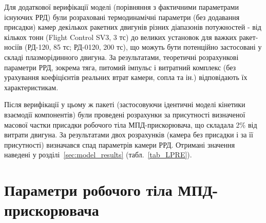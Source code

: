 Для додаткової верифікації моделі (порівняння з фактичними параметрами існуючих РРД) були розраховані термодинамічні параметри (без додавання присадки) камер декількох ракетних двигунів різних діапазонів потужностей - від кількох тонн (Flight Control SV3, 3 тс) до великих установок для важких ракет-носіїв (РД-120, 85 тс; РД-0120, 200 тс), що можуть бути потенційно застосовані у складі плазморідинного двигуна. За результатами, теоретичні розрахункові параметри РРД, зокрема тяга, питомий імпульс і витратний комплекс (без урахування коефіцієнтів реальних втрат камери, сопла та ін.) відповідають їх характеристикам.

Після верифікації у цьому ж пакеті (застосовуючи ідентичні моделі кінетики взаємодії компонентів) були проведені розрахунки за присутності визначеної масової частки присадки робочого тіла МПД-прискорювача, що складала 2\% від витрати двигуна. За результатами двох розрахунків (камера без присадки і за її присутності) визначався спад параметрів камери РРД. Отримані значення наведені у розділі~\ref{sec:model_results} (табл.~\ref{tab_LPRE}).






\section{Параметри робочого тіла МПД-прискорювача}

